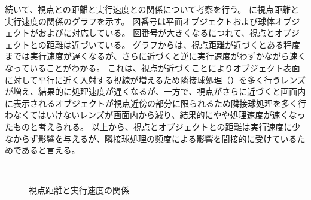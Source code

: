 続いて、視点との距離と実行速度との関係について考察を行う。
に視点距離と実行速度の関係のグラフを示す。
図番号は平面オブジェクトおよび球体オブジェクトがおよびに対応している。
図番号が大きくなるにつれて、視点とオブジェクトとの距離は近づいている。
グラフからは、視点距離が近づくとある程度までは実行速度が遅くなるが、さらに近づくと逆に実行速度がわずかながら速くなっていることがわかる。
これは、視点が近づくことによりオブジェクト表面に対して平行に近く入射する視線が増えるため隣接球処理（）を多く行うレンズが増え、結果的に処理速度が遅くなるが、一方で、視点がさらに近づくと画面内に表示されるオブジェクトが視点近傍の部分に限られるため隣接球処理を多く行わなくてはいけないレンズが画面内から減り、結果的にやや処理速度が速くなったものと考えられる。
以上から、視点とオブジェクトとの距離は実行速度に少なからず影響を与えるが、隣接球処理の頻度による影響を間接的に受けているためであると言える。

\begin{figure}[htbp]
  \centering
{}\\
  \caption{視点距離と実行速度の関係}
  \label{FDistGraph}
\end{figure}


